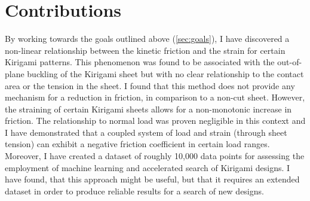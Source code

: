 \section{Contributions}
By working towards the goals outlined above (\cref{sec:goals}), I have
discovered a non-linear relationship between the kinetic friction and the strain
for certain Kirigami patterns. This phenomenon was found to be associated with
the out-of-plane buckling of the Kirigami sheet but with no clear relationship
to the contact area or the tension in the sheet. I found that this method does
not provide any mechanism for a reduction in friction, in comparison to a
non-cut sheet. However, the straining of certain Kirigami sheets allows for a
non-monotonic increase in friction. The relationship to normal load was proven
negligible in this context and I have demonstrated that a coupled system of load
and strain (through sheet tension) can exhibit a negative friction coefficient
in certain load ranges. Moreover, I have created a dataset of roughly 10,000
data points for assessing the employment of machine learning and accelerated
search of Kirigami designs. I have found, that this approach might be useful,
but that it requires an extended dataset in order to produce reliable results for a
search of new designs.

